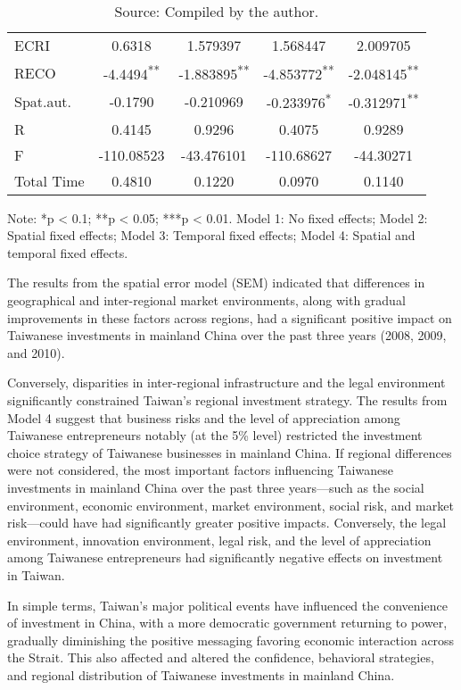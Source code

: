 \documentclass{article}
\begin{document}
\begin{table}[H]
\begin{tabular}{l S[table-format=-1.6] S[table-format=-1.6] S[table-format=-1.6] S[table-format=-1.6]}
ECRI      & 0.6318 & 1.579397 & 1.568447 & 2.009705 \\
RECO      & -4.4494\textsuperscript{**} & -1.883895\textsuperscript{**} & -4.853772\textsuperscript{**} & -2.048145\textsuperscript{**} \\
Spat.aut. & -0.1790 & -0.210969 & -0.233976\textsuperscript{*} & -0.312971\textsuperscript{**} \\
\midrule
R         & 0.4145 & 0.9296 & 0.4075 & 0.9289 \\
F         & -110.08523 & -43.476101 & -110.68627 & -44.30271 \\
Total Time & 0.4810 & 0.1220 & 0.0970 & 0.1140 \\
\bottomrule
\end{tabular}
\vspace{0.5cm}
\caption*{Note: *p < 0.1; **p < 0.05; ***p < 0.01. Model 1: No fixed effects; Model 2: Spatial fixed effects; Model 3: Temporal fixed effects; Model 4: Spatial and temporal fixed effects.}
\caption*{Source: Compiled by the author.}
\label{tab:SEM}
\end{table}

The results from the spatial error model (SEM) indicated that differences in geographical and inter-regional market environments, along with gradual improvements in these factors across regions, had a significant positive impact on Taiwanese investments in mainland China over the past three years (2008, 2009, and 2010). 

Conversely, disparities in inter-regional infrastructure and the legal environment significantly constrained Taiwan's regional investment strategy. The results from Model 4 suggest that business risks and the level of appreciation among Taiwanese entrepreneurs notably (at the 5\% level) restricted the investment choice strategy of Taiwanese businesses in mainland China. If regional differences were not considered, the most important factors influencing Taiwanese investments in mainland China over the past three years—such as the social environment, economic environment, market environment, social risk, and market risk—could have had significantly greater positive impacts. Conversely, the legal environment, innovation environment, legal risk, and the level of appreciation among Taiwanese entrepreneurs had significantly negative effects on investment in Taiwan. 

In simple terms, Taiwan's major political events have influenced the convenience of investment in China, with a more democratic government returning to power, gradually diminishing the positive messaging favoring economic interaction across the Strait. This also affected and altered the confidence, behavioral strategies, and regional distribution of Taiwanese investments in mainland China. 
\end{document}
